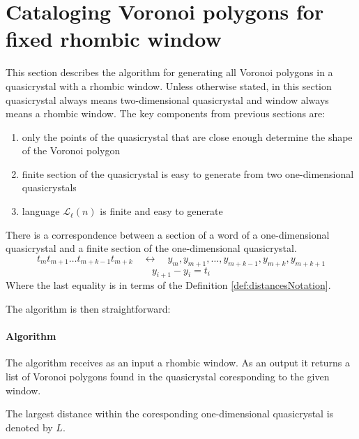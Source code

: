 \documentclass[text.tex]{subfiles}
\begin{document}
\section{Cataloging Voronoi polygons for fixed rhombic window}
This section describes the algorithm for generating all Voronoi polygons in a quasicrystal with a rhombic window. Unless otherwise stated, in this section quasicrystal always means two-dimensional quasicrystal and window always means a rhombic window. The key components from previous sections are:

\begin{enumerate}
\item only the points of the quasicrystal that are close enough determine the shape of the Voronoi polygon
\item finite section of the quasicrystal is easy to generate from two one-dimensional quasicrystals
\item language $\mathcal{L}_{\ell}(n)$ is finite and easy to generate
\end{enumerate}

There is a correspondence between a section of a word of a one-dimensional quasicrystal and a finite section of the one-dimensional quasicrystal. 
$$t_m t_{m+1}\dots t_{m+k-1} t_{m+k}\quad\longleftrightarrow\quad y_m, y_{m+1},\dots ,y_{m+k-1},y_{m+k},y_{m+k+1}$$
$$y_{i+1}-y_{i} = t_{i}$$
Where the last equality is in terms of the Definition \ref{def:distancesNotation}.

The algorithm is then straightforward:

\paragraph{Algorithm} The algorithm receives as an input a rhombic window. As an output it returns a list of Voronoi polygons found in the quasicrystal coresponding to the given window.

The largest distance within the coresponding one-dimensional quasicrystal is denoted by $L$. 
\end{document}
